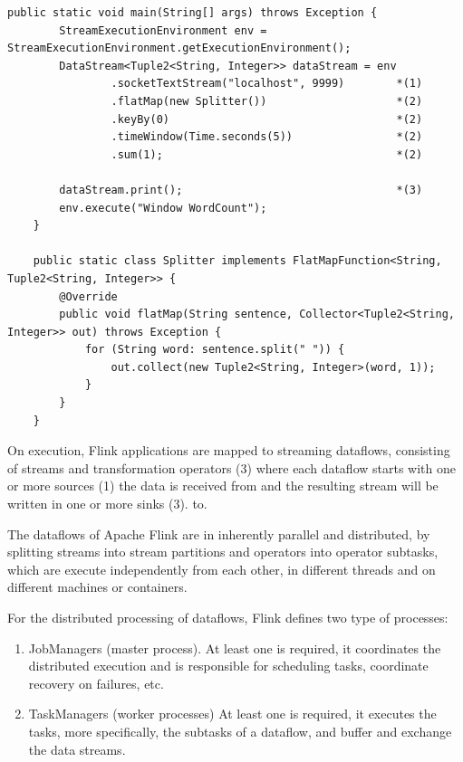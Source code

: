 \begin{lstlisting}[caption={Basic Apache Flink streaming application}, captionpos=b, label={lst:basicflink}]
public static void main(String[] args) throws Exception {
        StreamExecutionEnvironment env = StreamExecutionEnvironment.getExecutionEnvironment();
        DataStream<Tuple2<String, Integer>> dataStream = env
                .socketTextStream("localhost", 9999)        *(1)
                .flatMap(new Splitter())                    *(2)
                .keyBy(0)                                   *(2)
                .timeWindow(Time.seconds(5))                *(2)
                .sum(1);                                    *(2)

        dataStream.print();                                 *(3)
        env.execute("Window WordCount");
    }

    public static class Splitter implements FlatMapFunction<String, Tuple2<String, Integer>> {
        @Override
        public void flatMap(String sentence, Collector<Tuple2<String, Integer>> out) throws Exception {
            for (String word: sentence.split(" ")) {
                out.collect(new Tuple2<String, Integer>(word, 1));
            }
        }
    }
\end{lstlisting}

On execution, Flink applications are mapped to streaming dataflows, consisting of streams
and transformation operators (3) where each dataflow starts with one or more sources (1)
the data is received from and the resulting stream will be written in one or more sinks (3).
to.

The dataflows of Apache Flink are in inherently parallel and distributed, by splitting streams into
stream partitions and operators into operator subtasks, which are execute independently from each
other, in different threads and on different machines or containers.

For the distributed processing of dataflows, Flink defines two type of processes:

\begin{enumerate}
    \item JobManagers (master process). At least one is required, it coordinates the
    distributed execution and is responsible for scheduling tasks, coordinate recovery
    on failures, etc.
    \item TaskManagers (worker processes) At least one is required, it executes the tasks, more
    specifically, the subtasks of a dataflow, and buffer and exchange the data streams.
\end{enumerate}

